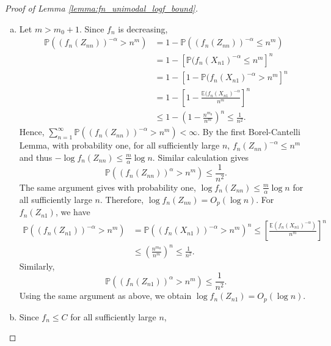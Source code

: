 \documentclass[12pt,letterpaper, twoside, openany]{article}
\theoremstyle{plain}
\begin{document}
\begin{proof}[Proof of Lemma \ref{lemma:fn_unimodal_logf_bound}]
    \begin{enumerate}[(a)]
        \item Let $m > m_0 + 1$. Since $f_n$ is decreasing,
        \begin{align*}
            \mathbb{P}( (f_n(Z_{nn}))^{-\alpha} > n^m ) &= 1 - \mathbb{P}( (f_n(Z_{nn}))^{-\alpha} \leq n^m )\\
            &= 1 - [\mathbb{P}( f_n(X_{n1})^{-\alpha} \leq n^m]^n \\
            &= 1 - [1 - \mathbb{P}( f_n(X_{n1})^{-\alpha} > n^m]^n\\
            &=1 - \left[ 1- \frac{\mathbb{E}(f_n(X_{n1})^{-\alpha}}{n^m} \right]^n\\
            &\leq 1 - \left( 1 - \frac{n^{m_0}}{n^m}\right)^n   \leq \frac{1}{n^2}.
        \end{align*}
        Hence, $\sum^\infty_{n=1} \mathbb{P}( (f_n(Z_{nn}))^{-\alpha} > n^m ) < \infty$. By the first Borel-Cantelli Lemma, with probability one, for all sufficiently large $n$, $f_n(Z_{nn})^{-\alpha} \leq n^m$ and thus $-\log f_n(Z_{nn}) \leq \frac{m}{\alpha} \log n$. Similar calculation gives
        \begin{equation*}
            \mathbb{P}( (f_n(Z_{nn}))^{\alpha} > n^m ) \leq \frac{1}{n^2}.
        \end{equation*}
        The same argument gives with probability one, $\log f_n(Z_{nn}) \leq \frac{m}{\alpha} \log n$ for all sufficiently large $n$. Therefore, $\log f_n(Z_{nn}) = O_p(\log n)$.
For $f_n(Z_{n1})$, we have
        \begin{align*}
            \mathbb{P}( (f_n(Z_{n1}))^{-\alpha} > n^m ) &=  \mathbb{P}( (f_n(X_{n1}))^{-\alpha} > n^m )^n
             \leq \left[ \frac{\mathbb{E}(f_n(X_{n1})^{-\alpha})}{n^m} \right]^n \\
            & \leq \left( \frac{n^{m_0}}{n^m}\right)^n \leq \frac{1}{n^2}.
        \end{align*}
        Similarly, 
        \begin{equation*}
            \mathbb{P}( (f_n(Z_{n1}))^{\alpha} > n^m ) \leq \frac{1}{n^2}.
        \end{equation*}
        Using the same argument as above, we obtain $\log f_n(Z_{n1}) = O_p(\log n)$.
\item Since $f_n \leq C$ for all sufficiently large $n$, 
        \begin{equation}\label{eq:log_concave_logmin}

\end{equation}
\end{enumerate}
\end{proof}
\end{document}
